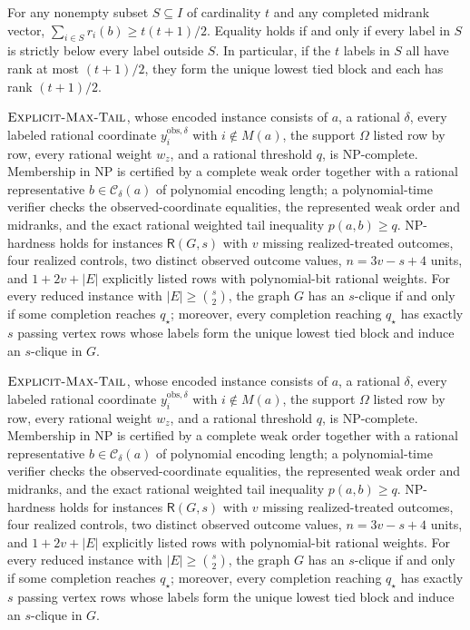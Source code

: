 For any nonempty subset \(S\subseteq I\) of cardinality \(t\) and any completed midrank vector, \(\sum_{i\in S}r_i(b)\ge t(t+1)/2\). Equality holds if and only if every label in \(S\) is strictly below every label outside \(S\). In particular, if the \(t\) labels in \(S\) all have rank at most \((t+1)/2\), they form the unique lowest tied block and each has rank \((t+1)/2\).

\(\textsc{Explicit-Max-Tail}\), whose encoded instance consists of \(a\), a rational \(\delta\), every labeled rational coordinate \(y_i^{\mathrm{obs},\delta}\) with \(i\notin M(a)\), the support \(\Omega\) listed row by row, every rational weight \(w_z\), and a rational threshold \(q\), is NP-complete. Membership in NP is certified by a complete weak order together with a rational representative \(b\in\mathcal C_\delta(a)\) of polynomial encoding length; a polynomial-time verifier checks the observed-coordinate equalities, the represented weak order and midranks, and the exact rational weighted tail inequality \(p(a,b)\ge q\). NP-hardness holds for instances \(\mathsf R(G,s)\) with \(v\) missing realized-treated outcomes, four realized controls, two distinct observed outcome values, \(n=3v-s+4\) units, and \(1+2v+|E|\) explicitly listed rows with polynomial-bit rational weights. For every reduced instance with \(|E|\ge\binom{s}{2}\), the graph \(G\) has an \(s\)-clique if and only if some completion reaches \(q_\star\); moreover, every completion reaching \(q_\star\) has exactly \(s\) passing vertex rows whose labels form the unique lowest tied block and induce an \(s\)-clique in \(G\).

\(\textsc{Explicit-Max-Tail}\), whose encoded instance consists of \(a\), a rational \(\delta\), every labeled rational coordinate \(y_i^{\mathrm{obs},\delta}\) with \(i\notin M(a)\), the support \(\Omega\) listed row by row, every rational weight \(w_z\), and a rational threshold \(q\), is NP-complete. Membership in NP is certified by a complete weak order together with a rational representative \(b\in\mathcal C_\delta(a)\) of polynomial encoding length; a polynomial-time verifier checks the observed-coordinate equalities, the represented weak order and midranks, and the exact rational weighted tail inequality \(p(a,b)\ge q\). NP-hardness holds for instances \(\mathsf R(G,s)\) with \(v\) missing realized-treated outcomes, four realized controls, two distinct observed outcome values, \(n=3v-s+4\) units, and \(1+2v+|E|\) explicitly listed rows with polynomial-bit rational weights. For every reduced instance with \(|E|\ge\binom{s}{2}\), the graph \(G\) has an \(s\)-clique if and only if some completion reaches \(q_\star\); moreover, every completion reaching \(q_\star\) has exactly \(s\) passing vertex rows whose labels form the unique lowest tied block and induce an \(s\)-clique in \(G\).

